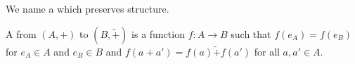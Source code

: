

We name a  which
preserves  structure.



A  from
 $(A, +)$ to
 $(B, \tilde{+})$
is a function $f: A \to B$ such that
$f(e_A) = f(e_B)$ for  $e_A \in A$
and $e_B \in B$ and $f(a + a') = f(a) \tilde{+} f(a')$
for all $a, a' \in A$.


